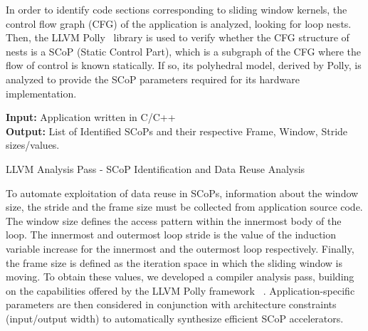 \documentclass[]{usiinfthesis}
\begin{document}
In order to identify code sections corresponding to sliding window
kernels, the control flow graph (CFG) of the application is analyzed,
looking for loop nests. Then, the LLVM Polly~\cite{GrosserApr12}
library is used to verify whether the CFG structure of nests is a SCoP
(Static Control Part), which is a subgraph of the CFG where the
  flow of control is known statically.  If so, its polyhedral model,
derived by Polly, is analyzed to provide the SCoP parameters required
for its hardware implementation.

\begin{algorithm}[t]
\begin{flushleft}
\textbf{Input:}  Application written in C/C++\\
\textbf{Output:} List of Identified SCoPs and their respective Frame, Window, Stride sizes/values.\\
\end{flushleft}
\begin{algorithmic}[1]
  \State{}
  \State{}
  \State{}
\EndFunction
\State
{}
  \State{}
  \State{}
    \State{}
    \State{}
    \State{}
    \State{}
    \State{}
  \EndIf
\EndFunction
\end{algorithmic}
\caption{LLVM Analysis Pass - SCoP Identification and 
Data Reuse Analysis}
\label{dr_Algo}
\end{algorithm}

To automate exploitation of data reuse in SCoPs, information about the
window size, the stride and the frame size must be collected from 
application source code. The window size defines the access pattern
within the innermost body of the loop.  The innermost and outermost
loop stride is the value of the induction variable increase for the innermost
and the outermost loop respectively. Finally, the frame size is
defined as the iteration space in which the sliding window is
moving. To obtain these values, we developed a compiler analysis pass,
building on the capabilities offered by the LLVM Polly framework
~\cite{GrosserApr12}. Application-specific parameters are then
considered in conjunction with architecture constraints (input/output
width) to automatically synthesize
efficient SCoP accelerators.\par
\end{document}
